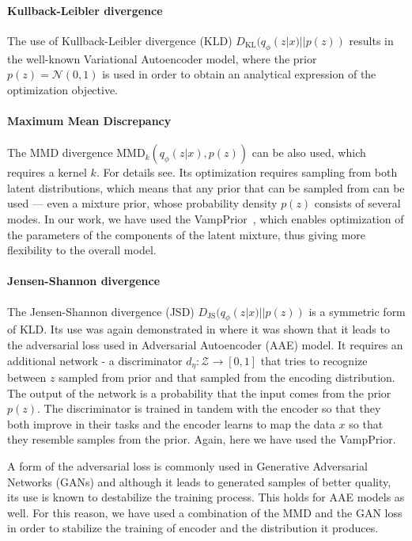 \paragraph{Kullback-Leibler divergence} 
The use of Kullback-Leibler divergence (KLD) $D_\text{KL}(q_{\phi}(z|x)||p(z))$ results in the well-known Variational Autoencoder model\cite{kingma2013vae}, where the prior $p(z)=\mathcal{N}(0,1)$ is used in order to obtain an analytical expression of the optimization objective.

\paragraph{Maximum Mean Discrepancy} 
The MMD divergence $\text{MMD}_k(q_{\phi}(z|x),p(z))$ can be also used, which requires a kernel $k$. For details see\cite{tolstikhin2017wasserstein}. Its optimization requires sampling from both latent distributions, which means that any prior that can be sampled from can be used --- even a mixture prior, whose probability density $p(z)$ consists of several modes. In our work, we have used the VampPrior~\cite{tomczak2017vae}, which enables optimization of the parameters of the components of the latent mixture, thus giving more flexibility to the overall model.

\paragraph{Jensen-Shannon divergence} 
The Jensen-Shannon divergence (JSD) $D_{\text{JS}}(q_{\phi}(z|x)||p(z))$ is a symmetric form of KLD. Its use was again demonstrated in\cite{tolstikhin2017wasserstein} where it was shown that it leads to the adversarial loss used in Adversarial Autoencoder (AAE) model\cite{makhzani2015adversarial}. It requires an additional network - a discriminator $d_\eta:\mathcal{Z}\rightarrow[0,1]$ that tries to recognize between $z$ sampled from prior and that sampled from the encoding distribution. The output of the network is a probability that the input comes from the prior $p(z)$. The discriminator is trained in tandem with the encoder so that they both improve in their tasks and the encoder learns to map the data $x$ so that they resemble samples from the prior. Again, here we have used the VampPrior.

A form of the adversarial loss is commonly used in Generative Adversarial Networks (GANs) and although it leads to generated samples of better quality, its use is known to destabilize the training process\cite{goodfellow2016nips}. This holds for AAE models as well. For this reason, we have used a combination of the MMD and the GAN loss in order to stabilize the training of encoder and the distribution it produces.

